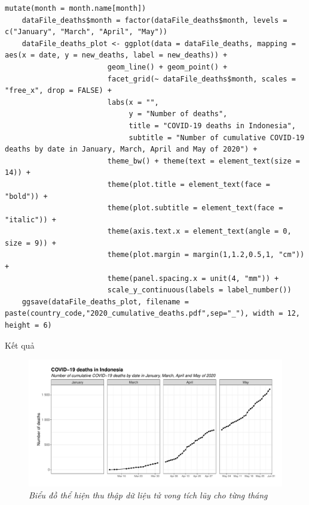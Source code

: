 \documentclass[a4paper]{article}
\theoremstyle{definition}
\begin{document}
\begin{enumerate}[1)]
\begin{lstlisting}[gobble=4]
                                       mutate(month = month.name[month])
    dataFile_deaths$month = factor(dataFile_deaths$month, levels = c("January", "March", "April", "May"))
    dataFile_deaths_plot <- ggplot(data = dataFile_deaths, mapping = aes(x = date, y = new_deaths, label = new_deaths)) +
                        geom_line() + geom_point() + 
                        facet_grid(~ dataFile_deaths$month, scales = "free_x", drop = FALSE) +
                        labs(x = "",
                             y = "Number of deaths",
                             title = "COVID-19 deaths in Indonesia",
                             subtitle = "Number of cumulative COVID-19 deaths by date in January, March, April and May of 2020") +
                        theme_bw() + theme(text = element_text(size = 14)) +
                        theme(plot.title = element_text(face = "bold")) +
                        theme(plot.subtitle = element_text(face = "italic")) +
                        theme(axis.text.x = element_text(angle = 0, size = 9)) +
                        theme(plot.margin = margin(1,1.2,0.5,1, "cm")) +
                        theme(panel.spacing.x = unit(4, "mm")) +
                        scale_y_continuous(labels = label_number())
    ggsave(dataFile_deaths_plot, filename = paste(country_code,"2020_cumulative_deaths.pdf",sep="_"), width = 12, height = 6)
    \end{lstlisting}
    Kết quả
    
    \begin{figure}[H]
        \begin{center}
            \includegraphics[scale=0.5]{v/IDN_2020_cumulative_deaths.pdf}
        \end{center}
    \caption{\it Biểu đồ thể hiện thu thập dữ liệu tử vong tích lũy cho từng tháng}
    \end{figure}
\end{enumerate}
\end{document}
